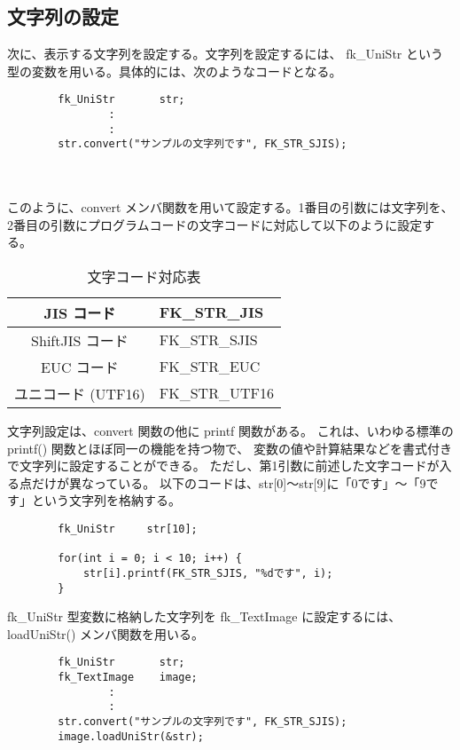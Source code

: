 \subsection{文字列の設定} \label{subsec:strDef}
次に、表示する文字列を設定する。文字列を設定するには、
fk\_UniStr という型の変数を用いる。具体的には、次のようなコードとなる。
\\
\begin{screen}
\begin{verbatim}
        fk_UniStr       str;
                :
                :
        str.convert("サンプルの文字列です", FK_STR_SJIS);
\end{verbatim}
\end{screen} \\ ~ \\
このように、convert メンバ関数を用いて設定する。1番目の引数には文字列を、
2番目の引数にプログラムコードの文字コードに対応して以下のように設定する。
\begin{table}[H]
\caption{文字コード対応表}
\label{tbl:strCode}
\begin{center}
\begin{tabular}{|c|l|}
\hline
JIS コード & FK\_STR\_JIS \\ \hline
ShiftJIS コード & FK\_STR\_SJIS \\ \hline
EUC コード & FK\_STR\_EUC \\ \hline
ユニコード (UTF16) & FK\_STR\_UTF16 \\ \hline
\end{tabular}
\end{center}
\end{table}

文字列設定は、convert 関数の他に printf 関数がある。
これは、いわゆる標準の printf() 関数とほぼ同一の機能を持つ物で、
変数の値や計算結果などを書式付きで文字列に設定することができる。
ただし、第1引数に前述した文字コードが入る点だけが異なっている。
以下のコードは、str[0]〜str[9]に「0です」〜「9です」という文字列を格納する。
\begin{screen}
\begin{verbatim}
        fk_UniStr     str[10];

        for(int i = 0; i < 10; i++) {
            str[i].printf(FK_STR_SJIS, "%dです", i);
        }
\end{verbatim}
\end{screen}

fk\_UniStr 型変数に格納した文字列を
fk\_TextImage に設定するには、loadUniStr() メンバ関数を用いる。
\\
\begin{screen}
\begin{verbatim}
        fk_UniStr       str;
        fk_TextImage    image;
                :
                :
        str.convert("サンプルの文字列です", FK_STR_SJIS);
        image.loadUniStr(&str);
\end{verbatim}
\end{screen}
